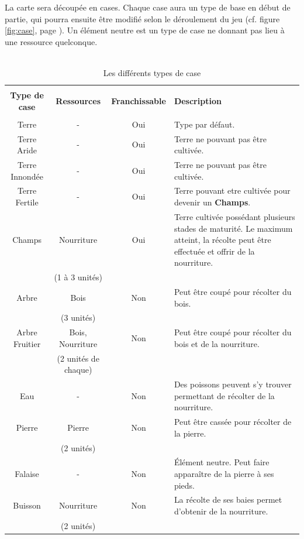 \documentclass[a4paper]{memoir}
\begin{document}
					La carte sera découpée en cases. Chaque case aura un type de base en début de partie, qui pourra ensuite être modifié selon le déroulement du jeu (cf. figure \ref{fig:case}, page \pageref{fig:case}). Un élément neutre est un type de case ne donnant pas lieu à une ressource quelconque.\\
					\\
					\begin{table}[H]
						\begin{small}
							\begin{tabular}{| c | c | c |p{5cm}|}
								\hline
								&    &    &    \\
								\textbf{Type de case} & \textbf{Ressources} & \textbf{Franchissable} & \textbf{Description}\\
								&    &    &    \\
								\hline
								Terre & - & Oui & Type par défaut.\\
								\hline
								Terre Aride & - & Oui & Terre ne pouvant pas être cultivée.\\
								\hline
								Terre Innondée & - & Oui & Terre ne pouvant pas être cultivée.\\
								\hline
								Terre Fertile & - & Oui & Terre pouvant etre cultivée pour devenir un \textbf{Champs}.\\
								\hline
								Champs & Nourriture & Oui & Terre cultivée possédant plusieurs stades de maturité. Le maximum atteint, la récolte peut être effectuée et offrir de la nourriture.\\
								& (1 à 3 unités) &    &    \\
								\hline
								Arbre & Bois & Non & Peut être coupé pour récolter du bois.\\
								& (3 unités) &    &    \\
								\hline
								Arbre Fruitier & Bois, Nourriture & Non & Peut être coupé pour récolter du bois et de la nourriture.\\
								& (2 unités de chaque) &    &    \\
								\hline
								Eau & - & Non & Des poissons peuvent s'y trouver permettant de récolter de la nourriture.\\
								\hline
								Pierre & Pierre & Non & Peut être cassée pour récolter de la pierre.\\
								& (2 unités) &    &    \\
								\hline
								Falaise & - & Non & \'Elément neutre. Peut faire apparaître de la pierre à ses pieds.\\
								\hline
								Buisson & Nourriture & Non & La récolte de ses baies permet d'obtenir de la nourriture.\\
								& (2 unités) &    &    \\
								\hline
							\end{tabular}
						\end{small}
						\label{tab:case}
						\caption{Les différents types de case}
					\end{table}
		
\end{document}
